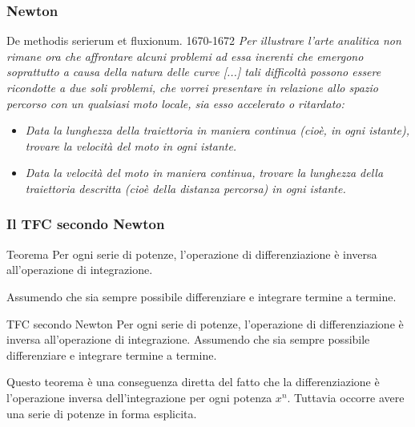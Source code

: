 \begin{frame}[label=Newton]
  \frametitle{Newton}

  \begin{block}{De methodis serierum et fluxionum. 1670-1672}
    \textit{Per illustrare l'arte analitica non rimane ora che affrontare alcuni problemi
    ad essa inerenti che emergono soprattutto a causa della natura delle curve [...]
    tali difficoltà possono essere ricondotte a due soli problemi, che vorrei presentare 
    in relazione allo spazio percorso con un qualsiasi moto locale, sia esso accelerato
    o ritardato:}
  
    \begin{itemize}
      \item
      \textit{Data la lunghezza della traiettoria in maniera continua (cioè, in ogni istante),
        trovare la velocità del moto in ogni istante.}
      \item
      \textit{Data la velocità del moto in maniera continua, trovare la lunghezza della traiettoria
        descritta (cioè della distanza percorsa) in ogni istante.}
      \end{itemize}
  \end{block}

\end{frame}

\begin{frame}
  \frametitle{Il TFC secondo Newton}
  \begin{theorem}{Teorema}
    Per ogni serie di potenze, l'operazione di differenziazione è 
    inversa all'operazione di integrazione. 
  \end{theorem}
  \begin{block}
    Assumendo che sia sempre possibile
    differenziare e integrare termine a termine.
  \end{block}
\end{frame}

\begin{frame}[label=Newton teorema]
    \begin{block}{TFC secondo Newton}
      Per ogni serie di potenze, l'operazione di differenziazione è 
      inversa all'operazione di integrazione. Assumendo che sia sempre possibile
      differenziare e integrare termine a termine.
    \end{block}
    \pause
    Questo teorema è una conseguenza diretta del fatto che la differenziazione è
    l'operazione inversa dell'integrazione per ogni potenza $x^n$. Tuttavia occorre
    avere una serie di potenze in forma esplicita.
  
\end{frame}